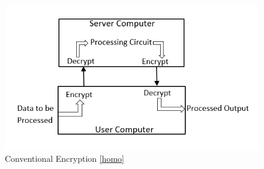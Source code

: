 \begin{figure}[!h]
\centering
\includegraphics[scale=0.75]{figures/Capture1.PNG}
\caption{Conventional Encryption \ref{homo}}
\label{fig:Conventional Encryption}
\end{figure}